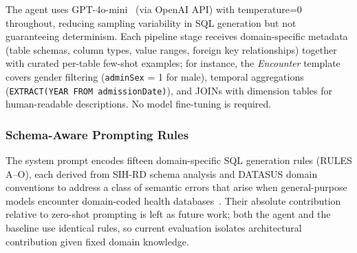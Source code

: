 \documentclass[conference]{IEEEtran}
\begin{document}
The agent uses GPT-4o-mini~\cite{openai2024gpt4omini} (via OpenAI API) with temperature=0 throughout, reducing sampling variability in SQL generation but not guaranteeing determinism. Each pipeline stage receives domain-specific metadata (table schemas, column types, value ranges, foreign key relationships) together with curated per-table few-shot examples; for instance, the \textit{Encounter} template covers gender filtering (\texttt{adminSex} = 1 for male), temporal aggregations (\texttt{EXTRACT(YEAR FROM admissionDate)}), and JOINs with dimension tables for human-readable descriptions. No model fine-tuning is required.




\subsubsection{Schema-Aware Prompting Rules}

The system prompt encodes fifteen domain-specific SQL generation rules (RULES A--O), each derived from SIH-RD schema analysis and DATASUS domain conventions to address a class of semantic errors that arise when general-purpose models encounter domain-coded health databases~\cite{Alhejaily2025}. Their absolute contribution relative to zero-shot prompting is left as future work; both the agent and the baseline use identical rules, so current evaluation isolates architectural contribution given fixed domain knowledge.
\end{document}
